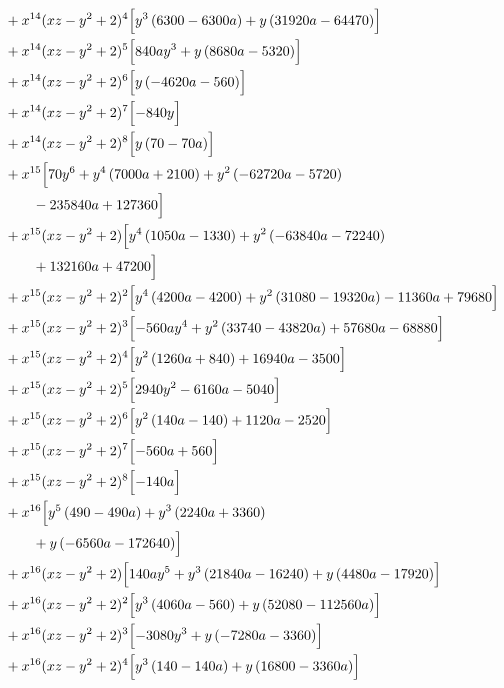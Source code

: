 \begin{align*}
&{}+x^{14}(xz-y^2+2)^{4}\Bigl[y^{3} \left(6300 - 6300 a\right) + y \left(31920 a - 64470\right)\Bigr]\\
&{}+x^{14}(xz-y^2+2)^{5}\Bigl[840 a y^{3} + y \left(8680 a - 5320\right)\Bigr]\\
&{}+x^{14}(xz-y^2+2)^{6}\Bigl[y \left(- 4620 a - 560\right)\Bigr]\\
&{}+x^{14}(xz-y^2+2)^{7}\Bigl[- 840 y\Bigr]\\
&{}+x^{14}(xz-y^2+2)^{8}\Bigl[y \left(70 - 70 a\right)\Bigr]\\
&{}+x^{15}\Bigl[70 y^{6} + y^{4} \left(7000 a + 2100\right) + y^{2} \left(- 62720 a - 5720\right)\\
&\qquad - 235840 a + 127360\Bigr]\\
&{}+x^{15}(xz-y^2+2)\Bigl[y^{4} \left(1050 a - 1330\right) + y^{2} \left(- 63840 a - 72240\right)\\
&\qquad + 132160 a + 47200\Bigr]\\
&{}+x^{15}(xz-y^2+2)^{2}\Bigl[y^{4} \left(4200 a - 4200\right) + y^{2} \left(31080 - 19320 a\right) - 11360 a + 79680\Bigr]\\
&{}+x^{15}(xz-y^2+2)^{3}\Bigl[- 560 a y^{4} + y^{2} \left(33740 - 43820 a\right) + 57680 a - 68880\Bigr]\\
&{}+x^{15}(xz-y^2+2)^{4}\Bigl[y^{2} \left(1260 a + 840\right) + 16940 a - 3500\Bigr]\\
&{}+x^{15}(xz-y^2+2)^{5}\Bigl[2940 y^{2} - 6160 a - 5040\Bigr]\\
&{}+x^{15}(xz-y^2+2)^{6}\Bigl[y^{2} \left(140 a - 140\right) + 1120 a - 2520\Bigr]\\
&{}+x^{15}(xz-y^2+2)^{7}\Bigl[- 560 a + 560\Bigr]\\
&{}+x^{15}(xz-y^2+2)^{8}\Bigl[- 140 a\Bigr]\\
&{}+x^{16}\Bigl[y^{5} \left(490 - 490 a\right) + y^{3} \left(2240 a + 3360\right)\\
&\qquad + y \left(- 6560 a - 172640\right)\Bigr]\\
&{}+x^{16}(xz-y^2+2)\Bigl[140 a y^{5} + y^{3} \left(21840 a - 16240\right) + y \left(4480 a - 17920\right)\Bigr]\\
&{}+x^{16}(xz-y^2+2)^{2}\Bigl[y^{3} \left(4060 a - 560\right) + y \left(52080 - 112560 a\right)\Bigr]\\
&{}+x^{16}(xz-y^2+2)^{3}\Bigl[- 3080 y^{3} + y \left(- 7280 a - 3360\right)\Bigr]\\
&{}+x^{16}(xz-y^2+2)^{4}\Bigl[y^{3} \left(140 - 140 a\right) + y \left(16800 - 3360 a\right)\Bigr]\\

\end{align*}
